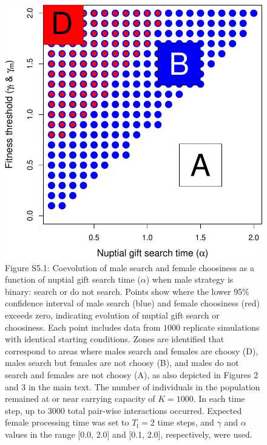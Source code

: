 \documentclass[
]{article}
\begin{document}
\begin{figure}
\centering
\includegraphics{index_files/figure-latex/unnamed-chunk-13-1.pdf}
\caption{Figure S5.1: Coevolution of male search and female choosiness
as a function of nuptial gift search time (\(\alpha\)) when male
strategy is binary: search or do not search. Points show where the lower
95\% confidence interval of male search (blue) and female choosiness
(red) exceeds zero, indicating evolution of nuptial gift search or
choosiness. Each point includes data from \(1000\) replicate simulations
with identical starting conditions. Zones are identified that correspond
to areas where males search and females are choosy (D), males search but
females are not choosy (B), and males do not search and females are not
choosy (A), as also depicted in Figures 2 and 3 in the main text. The
number of individuals in the population remained at or near carrying
capacity of \(K = 1000\). In each time step, up to 3000 total pair-wise
interactions occurred. Expected female processing time was set to
\(T_{\mathrm{f}}=2\) time steps, and \(\gamma\) and \(\alpha\) values in
the range {[}0.0, 2.0{]} and {[}0.1, 2.0{]}, respectively, were used.}
\end{figure}

\captionsetup{labelformat=default}

\clearpage
\end{document}
